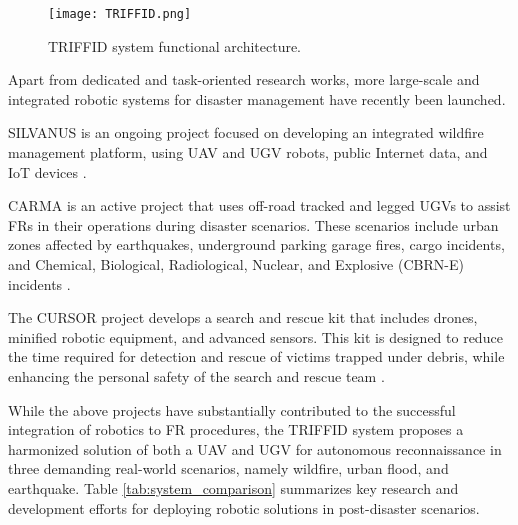 \begin{figure*}
  \centering
  \texttt{[image: TRIFFID.png]}
  \caption{TRIFFID system functional architecture.}
  \label{fig:triffid-functional-arch}
\end{figure*}

Apart from dedicated and task-oriented research works, more large-scale and integrated robotic systems for disaster management have recently been launched.

SILVANUS is an ongoing project focused on developing an integrated wildfire management platform, using UAV and UGV robots, public Internet data, and IoT devices \cite{SILVANUSIntegratedTechnological2021}.

CARMA is an active project that uses off-road tracked and legged UGVs to assist FRs in their operations during disaster scenarios. These scenarios include urban zones affected by earthquakes, underground parking garage fires, cargo incidents, and Chemical, Biological, Radiological, Nuclear, and Explosive (CBRN-E) incidents \cite{CARMAProject2024}.

The CURSOR project develops a search and rescue kit that includes drones, minified robotic equipment, and advanced sensors. This kit is designed to reduce the time required for detection and rescue of victims trapped under debris, while enhancing the personal safety of the search and rescue team \cite{ristmaeCURSORSearchRescue2021}.

While the above projects have substantially contributed to the successful integration of robotics to FR procedures, the TRIFFID system proposes a harmonized solution of both a UAV and UGV for autonomous reconnaissance in three demanding real-world scenarios, namely wildfire, urban flood, and earthquake. Table \ref{tab:system_comparison} summarizes key research and development efforts for deploying robotic solutions in post-disaster scenarios.